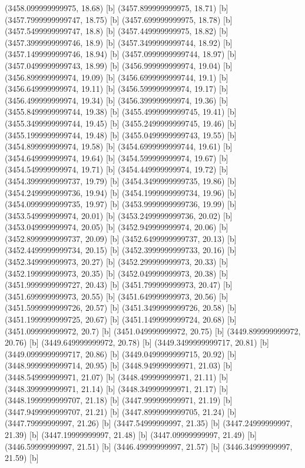 {{{(3458.099999999975, 18.68) [b] 
(3457.899999999975, 18.71) [b] 
(3457.7999999999747, 18.75) [b] 
(3457.699999999975, 18.78) [b] 
(3457.5499999999747, 18.8) [b] 
(3457.449999999975, 18.82) [b] 
(3457.3999999999746, 18.9) [b] 
(3457.3499999999744, 18.92) [b] 
(3457.1499999999746, 18.94) [b] 
(3457.0999999999744, 18.97) [b] 
(3457.0499999999743, 18.99) [b] 
(3456.999999999974, 19.04) [b] 
(3456.899999999974, 19.09) [b] 
(3456.6999999999744, 19.1) [b] 
(3456.649999999974, 19.11) [b] 
(3456.599999999974, 19.17) [b] 
(3456.499999999974, 19.34) [b] 
(3456.399999999974, 19.36) [b] 
(3455.8499999999744, 19.38) [b] 
(3455.4999999999745, 19.41) [b] 
(3455.3499999999744, 19.45) [b] 
(3455.2499999999745, 19.46) [b] 
(3455.1999999999744, 19.48) [b] 
(3455.0499999999743, 19.55) [b] 
(3454.899999999974, 19.58) [b] 
(3454.6999999999744, 19.61) [b] 
(3454.649999999974, 19.64) [b] 
(3454.599999999974, 19.67) [b] 
(3454.549999999974, 19.71) [b] 
(3454.449999999974, 19.72) [b] 
(3454.3999999999737, 19.79) [b] 
(3454.3499999999735, 19.86) [b] 
(3454.2499999999736, 19.94) [b] 
(3454.1999999999734, 19.96) [b] 
(3454.0999999999735, 19.97) [b] 
(3453.9999999999736, 19.99) [b] 
(3453.549999999974, 20.01) [b] 
(3453.2499999999736, 20.02) [b] 
(3453.049999999974, 20.05) [b] 
(3452.949999999974, 20.06) [b] 
(3452.8999999999737, 20.09) [b] 
(3452.6499999999737, 20.13) [b] 
(3452.4499999999734, 20.15) [b] 
(3452.3999999999733, 20.16) [b] 
(3452.349999999973, 20.27) [b] 
(3452.299999999973, 20.33) [b] 
(3452.199999999973, 20.35) [b] 
(3452.049999999973, 20.38) [b] 
(3451.9999999999727, 20.43) [b] 
(3451.799999999973, 20.47) [b] 
(3451.699999999973, 20.55) [b] 
(3451.649999999973, 20.56) [b] 
(3451.5999999999726, 20.57) [b] 
(3451.3499999999726, 20.58) [b] 
(3451.1999999999725, 20.67) [b] 
(3451.1499999999724, 20.68) [b] 
(3451.099999999972, 20.7) [b] 
(3451.049999999972, 20.75) [b] 
(3449.899999999972, 20.76) [b] 
(3449.649999999972, 20.78) [b] 
(3449.3499999999717, 20.81) [b] 
(3449.0999999999717, 20.86) [b] 
(3449.0499999999715, 20.92) [b] 
(3448.9999999999714, 20.95) [b] 
(3448.949999999971, 21.03) [b] 
(3448.549999999971, 21.07) [b] 
(3448.499999999971, 21.11) [b] 
(3448.399999999971, 21.14) [b] 
(3448.349999999971, 21.17) [b] 
(3448.1999999999707, 21.18) [b] 
(3447.999999999971, 21.19) [b] 
(3447.9499999999707, 21.21) [b] 
(3447.8999999999705, 21.24) [b] 
(3447.79999999997, 21.26) [b] 
(3447.54999999997, 21.35) [b] 
(3447.24999999997, 21.39) [b] 
(3447.19999999997, 21.48) [b] 
(3447.09999999997, 21.49) [b] 
(3446.59999999997, 21.51) [b] 
(3446.49999999997, 21.57) [b] 
(3446.34999999997, 21.59) [b] 
}}}
